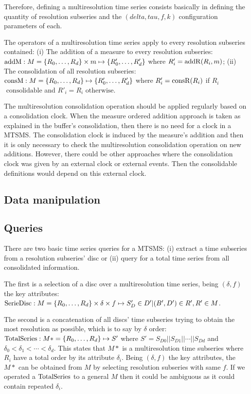 Therefore, defining a multiresolution time series consists basically
in defining the quantity of resolution subseries and the $(delta,tau,f,k)$
configuration parameters of each.


The operators of a multiresolution time series apply to every
resolution subseries contained: (i) The addition of a measure to every
resolution subseries: $\operatorname{addM} : M=\{R_0,\allowbreak \dots,\allowbreak
R_d\} \times m \mapsto \{R'_0, \dots,\allowbreak R'_d\}$ where
$R'_i=\operatorname{addR}(R_i,m)$; (ii) The consolidation of all resolution
subseries: $\operatorname{consM} : M=\{R_0,\allowbreak \dots,\allowbreak R_d\}
\mapsto \{R'_0,\allowbreak \dots,\allowbreak R'_d\}$ where $R'_i =
\operatorname{consR}(R_i)$ if $R_i$ $\text{ consolidable}$ and $R'_i=R_i$
$\text{otherwise}$.


The multiresolution consolidation operation should be applied
regularly based on a consolidation clock. When the measure ordered
addition approach is taken as explained in the buffer's consolidation,
then there is no need for a clock in a MTSMS. The consolidation clock
is induced by the measure's addition and then it is only necessary to
check the multiresolution consolidation operation on new
additions. However, there could be other approaches where the
consolidation clock was given by an external clock or external
events. Then the consolidable definitions would depend on this
external clock.


\subsection{Data manipulation}





\subsection{Queries}


There are two basic time series queries for a MTSMS: (i) extract a
time subseries from a resolution subseries' disc or (ii) query for a
total time series from all consolidated information.

The first is a selection of a disc over a multiresolution time series,
being $(\delta,f)$ the key attributes: $\operatorname{SerieDisc}: M=\{R_0, \dots,
R_d\} \times \delta \times f \mapsto S'_D \in D' | (B',D') \in R',R' \in
M$.

The second is a concatenation of all discs' time subseries trying to
obtain the most resolution as possible, which is to say by $\delta$
order: $\operatorname{TotalSeries}: M*=\{R_0, \dots, R_d\} \mapsto S'$ where $S' =
S_{D0} || S_{D1} || \cdots || S_{Dd}$ and $\delta_0 < \delta_1 <
\cdots < \delta_d$. This states that $M*$ is a multiresolution time
subseries where $R_i$ have a total order by its attribute
$\delta_i$. Being $(\delta,f)$ the key attributes, the $M*$ can
be obtained from $M$ by selecting resolution subseries with same $f$. If we
operated a $\operatorname{TotalSeries}$ to a general $M$ then it could be ambiguous
as it could contain repeated $\delta_i$.


